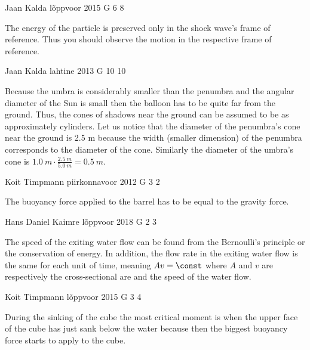 \documentclass[11pt]{article}
\begin{document}
{Jaan Kalda} %
{lõppvoor} %
{2015} %
{G 6} %
{8} %
{

\ifEngHint
The energy of the particle is preserved only in the shock wave’s frame of reference. Thus you should observe the motion in the respective frame of reference.
\fi
}

{Jaan Kalda} %
{lahtine} %
{2013} %
{G 10} %
{10} %
{

\ifEngHint
Because the umbra is considerably smaller than the penumbra and the angular diameter of the Sun is small then the balloon has to be quite far from the ground. Thus, the cones of shadows near the ground can be assumed to be as approximately cylinders. Let us notice that the diameter of the penumbra’s cone near the ground is 2.5 m because the width (smaller dimension) of the penumbra corresponds to the diameter of the cone. Similarly the diameter of the umbra’s cone is $\SI{1,0}{m}\cdot\frac{\SI{2,5}{m}}{\SI{5,0}{m}} = \SI{0,5}{m}$.
\fi
}

{Koit Timpmann} %
{piirkonnavoor} %
{2012} %
{G 3} %
{2} %
{

\ifEngHint
The buoyancy force applied to the barrel has to be equal to the gravity force.
\fi
}

{Hans Daniel Kaimre} %
{lõppvoor} %
{2018} %
{G 2} %
{3} %
{

\ifEngHint
The speed of the exiting water flow can be found from the Bernoulli’s principle or the conservation of energy. In addition, the flow rate in the exiting water flow is the same for each unit of time, meaning $Av = \const$ where $A$ and $v$ are respectively the cross-sectional are and the speed of the water flow.
\fi
}

{Koit Timpmann} %
{lõppvoor} %
{2015} %
{G 3} %
{4} %
{

\ifEngHint
During the sinking of the cube the most critical moment is when the upper face of the cube has just sank below the water because then the biggest buoyancy force starts to apply to the cube.
\fi
}
\end{document}
